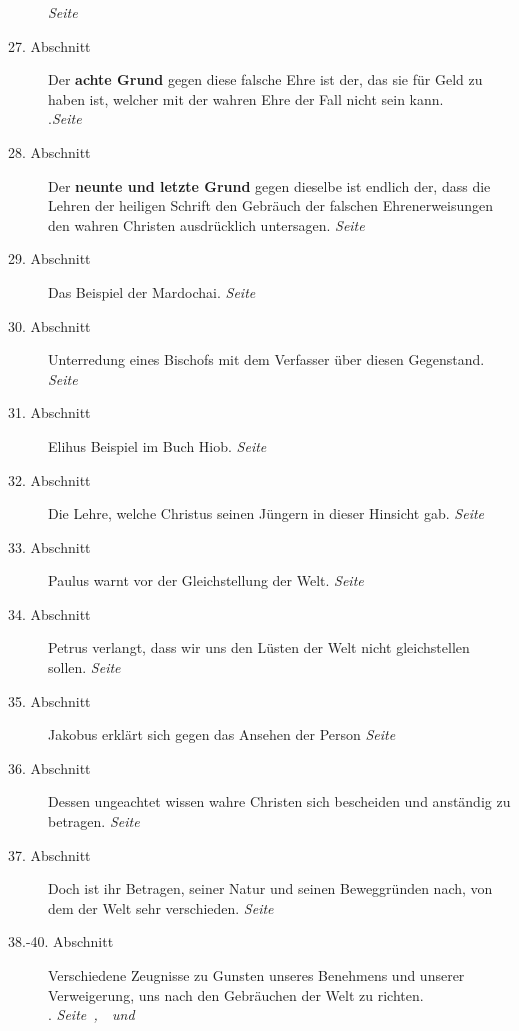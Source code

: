 \begin{description}
\dotfill \textit{Seite~\pageref{kap9_ab26}}\\
\item[27. Abschnitt] Der \textbf{achte Grund} gegen diese falsche Ehre ist der,
das sie
für Geld zu haben ist, welcher mit der wahren Ehre der Fall nicht sein kann.\\
.\dotfill \textit{Seite~\pageref{kap9_ab27}}\\
\item[28. Abschnitt] Der \textbf{neunte und letzte Grund} gegen dieselbe ist
endlich der,
dass die Lehren der heiligen Schrift den Gebräuch der falschen Ehrenerweisungen
den wahren Christen ausdrücklich untersagen.
\dotfill \textit{Seite~\pageref{kap9_ab28}}\\
\item[29. Abschnitt] Das Beispiel der Mardochai.
\dotfill \textit{Seite~\pageref{kap9_ab29}}\\
\item[30. Abschnitt] Unterredung eines Bischofs mit dem Verfasser über diesen
Gegenstand.
\dotfill \textit{Seite~\pageref{kap9_ab30}}\\
\item[31. Abschnitt] Elihus Beispiel im Buch Hiob.
\dotfill \textit{Seite~\pageref{kap9_ab31}}\\
\item[32. Abschnitt] Die Lehre, welche Christus seinen Jüngern in dieser
Hinsicht gab.
\dotfill \textit{Seite~\pageref{kap9_ab32}}\\
\item[33. Abschnitt] Paulus warnt vor der Gleichstellung der Welt.
\dotfill \textit{Seite~\pageref{kap9_ab33}}\\
\item[34. Abschnitt] Petrus verlangt, dass wir uns den Lüsten der Welt nicht
gleichstellen sollen.
\dotfill \textit{Seite~\pageref{kap9_ab34}}\\
\item[35. Abschnitt] Jakobus erklärt sich gegen das Ansehen der Person
\dotfill \textit{Seite~\pageref{kap9_ab35}}\\
\item[36. Abschnitt] Dessen ungeachtet wissen wahre Christen sich bescheiden und
anständig zu betragen.
\dotfill \textit{Seite~\pageref{kap9_ab36}}\\
\item[37. Abschnitt] Doch ist ihr Betragen, seiner Natur und seinen Beweggründen
nach, von dem der Welt sehr verschieden.
\dotfill \textit{Seite~\pageref{kap9_ab37}}\\
\item[38.-40. Abschnitt] Verschiedene Zeugnisse zu Gunsten unseres Benehmens und
unserer Verweigerung, uns nach den Gebräuchen der Welt zu richten.\\
.\dotfill
\textit{Seite~\pageref{kap9_ab38},~\pageref{kap9_ab39}~und~\pageref{kap9_ab40}}
\\

\end{description}

